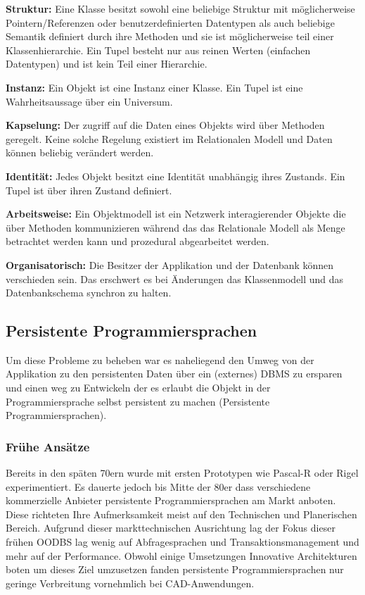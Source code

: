\begin{description}
	\item \textbf{Struktur:} 
		Eine Klasse besitzt sowohl eine beliebige Struktur mit möglicherweise Pointern/Referenzen oder benutzerdefinierten Datentypen als auch beliebige Semantik definiert durch ihre Methoden und sie ist möglicherweise teil einer Klassenhierarchie. Ein Tupel besteht nur aus reinen Werten (einfachen Datentypen) und ist kein Teil einer Hierarchie.
	
	\item \textbf{Instanz:}
		Ein Objekt ist eine Instanz einer Klasse. Ein Tupel ist eine Wahrheitsaussage über ein Universum.
	
	\item \textbf{Kapselung:} 
		Der zugriff auf die Daten eines Objekts wird über Methoden geregelt. Keine solche Regelung existiert im Relationalen Modell und Daten können beliebig verändert werden.
	
	\item \textbf{Identität:}
		Jedes Objekt besitzt eine Identität unabhängig ihres Zustands. Ein Tupel ist über ihren Zustand definiert. 
	
	\item \textbf{Arbeitsweise:}
		Ein Objektmodell ist ein Netzwerk interagierender Objekte die über Methoden kommunizieren während das das Relationale Modell als Menge betrachtet werden kann und prozedural abgearbeitet werden.
	
	\item \textbf{Organisatorisch:} 
		Die Besitzer der Applikation und der Datenbank können verschieden sein. Das erschwert es bei Änderungen das Klassenmodell und das Datenbankschema synchron zu halten. 
	
\end{description}


\subsection{Persistente Programmiersprachen}
Um diese Probleme zu beheben war es naheliegend den Umweg von der Applikation zu den persistenten Daten über ein (externes) DBMS zu ersparen und einen weg zu Entwickeln der es erlaubt die Objekt in der Programmiersprache selbst persistent zu machen (Persistente Programmiersprachen).

\subsubsection{Frühe Ansätze}
Bereits in den späten 70ern wurde mit ersten Prototypen wie Pascal-R oder Rigel experimentiert. Es dauerte jedoch bis Mitte der 80er dass verschiedene kommerzielle Anbieter persistente Programmiersprachen am Markt anboten. Diese richteten Ihre Aufmerksamkeit meist auf den Technischen und Planerischen Bereich. Aufgrund dieser markttechnischen Ausrichtung lag der Fokus dieser frühen OODBS lag wenig auf Abfragesprachen und Transaktionsmanagement und mehr auf der Performance. Obwohl einige Umsetzungen Innovative Architekturen boten um dieses Ziel umzusetzen fanden persistente Programmiersprachen nur geringe Verbreitung vornehmlich bei CAD-Anwendungen.


